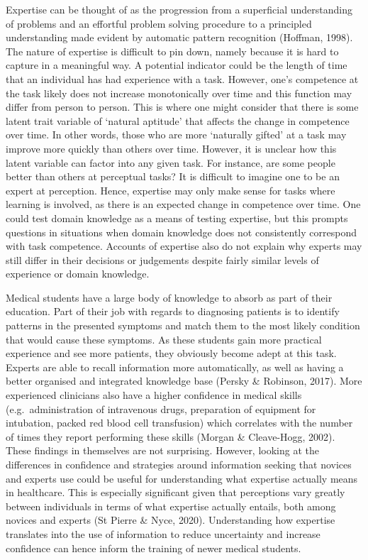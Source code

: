 \documentclass[a4paper, nobind]{templates/ociamthesis}
\begin{document}
Expertise can be thought of as the progression from a superficial understanding of problems and an effortful problem solving procedure to a principled understanding made evident by automatic pattern recognition (Hoffman, 1998). The nature of expertise is difficult to pin down, namely because it is hard to capture in a meaningful way. A potential indicator could be the length of time that an individual has had experience with a task. However, one's competence at the task likely does not increase monotonically over time and this function may differ from person to person. This is where one might consider that there is some latent trait variable of `natural aptitude' that affects the change in competence over time. In other words, those who are more `naturally gifted' at a task may improve more quickly than others over time. However, it is unclear how this latent variable can factor into any given task. For instance, are some people better than others at perceptual tasks? It is difficult to imagine one to be an expert at perception. Hence, expertise may only make sense for tasks where learning is involved, as there is an expected change in competence over time. One could test domain knowledge as a means of testing expertise, but this prompts questions in situations when domain knowledge does not consistently correspond with task competence. Accounts of expertise also do not explain why experts may still differ in their decisions or judgements despite fairly similar levels of experience or domain knowledge.

Medical students have a large body of knowledge to absorb as part of their education. Part of their job with regards to diagnosing patients is to identify patterns in the presented symptoms and match them to the most likely condition that would cause these symptoms. As these students gain more practical experience and see more patients, they obviously become adept at this task. Experts are able to recall information more automatically, as well as having a better organised and integrated knowledge base (Persky \& Robinson, 2017). More experienced clinicians also have a higher confidence in medical skills (e.g.~administration of intravenous drugs, preparation of equipment for intubation, packed red blood cell transfusion) which correlates with the number of times they report performing these skills (Morgan \& Cleave-Hogg, 2002). These findings in themselves are not surprising. However, looking at the differences in confidence and strategies around information seeking that novices and experts use could be useful for understanding what expertise actually means in healthcare. This is especially significant given that perceptions vary greatly between individuals in terms of what expertise actually entails, both among novices and experts (St Pierre \& Nyce, 2020). Understanding how expertise translates into the use of information to reduce uncertainty and increase confidence can hence inform the training of newer medical students.
\end{document}
